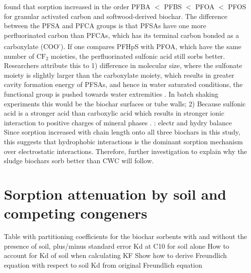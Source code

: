 \cite{zhang2021sorption} found that sorption increased in the order PFBA $<$ PFBS $<$ PFOA $<$ PFOS for granular activated carbon and softwood-derived biochar. The difference between the PFSA and PFCA groups is that PFSAs have one more perfluorinated carbon than PFCAs, which has its terminal carbon bonded as a carboxylate (COO\textsuperscript{-}). If one compares PFHpS with PFOA, which have the same number of $\mathrm{CF_2}$ moieties, the perfluorinated sulfonic acid still sorbs better. Researchers attribute this to 1) difference in molecular size, where the sulfonate moiety is slightly larger than the carboxylate moiety, which results in greater cavity formation energy of PFSAs, and hence in water saturated conditions, the functional group is pushed towards water extremities \citep{yin2022insights,sigmund2022sorption}. In batch shaking experiments this would be the biochar surfaces or tube walls; 2) Because sulfonic acid is a stronger acid than carboxylic acid which results in stronger ionic interaction to positive charges of mineral phases \citep{arvaniti2015review}. \cite{du2014adsorption}: electr and hydry balance Since sorption increased with chain length onto all three biochars in this study, this suggests that hydrophobic interactions is the dominant sorption mechanism over electrostatic interactions. Therefore, further investigation to explain why the sludge biochars sorb better than CWC will follow. 


\section{Sorption attenuation by soil and competing congeners}
Table with partitioning coefficients for the biochar sorbents with and without the presence of soil, plus/minus standard error
Kd at C10 for soil alone
How to account for Kd of soil when calculating KF 
    Show how to derive Freundlich equation with respect to soil Kd from original Freundlich equation

